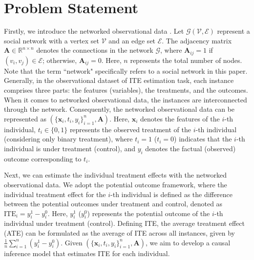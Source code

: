 \documentclass[twoside,leqno,twocolumn]{article}
\begin{document}
\section{Problem Statement}
Firstly, we introduce the networked observational data \cite{guo2020learning}. Let $\mathcal{G({V, E})}$ represent a social network with a vertex set $\mathcal{V}$ and an edge set $\mathcal{E}$. The adjacency matrix $\mathbf{A}\in \mathbb{R}^{n \times n}$ denotes the connections in the network $\mathcal{G}$, where $\mathbf{A}_{ij}=1$ if $(v_i, v_j)\in \mathcal{E}$; otherwise, $\mathbf{A}_{ij}=0$. Here, $n$ represents the total number of nodes. Note that the term ``network" specifically refers to a social network in this paper. 
Generally, in the observational dataset of ITE estimation task, each instance comprises three parts: the features (variables), the treatments, and the outcomes. 
When it comes to networked observational data, the instances are interconnected through the network. Consequently, the networked observational data can be represented as $(\{\mathbf{x}_i, t_i, y_i\}_{i=1}^n, \mathbf{A})$. Here, $\mathbf{x}_i$ denotes the features of the $i$-th individual, $t_i \in \{0,1\}$ represents the observed treatment of the $i$-th individual (considering only binary treatment), where $t_i=1$ ($t_i=0$) indicates that the $i$-th individual is under treatment (control), and $y_i$ denotes the factual (observed) outcome corresponding to $t_i$.

Next, we can estimate the individual treatment effects with the networked observational data. We adopt the potential outcome framework, where the individual treatment effect for the $i$-th individual is defined as the difference between the potential outcomes under treatment and control, denoted as $\text{ITE}_i=y_i^1-y_i^0$. Here, $y_i^1$ ($y_i^0$) represents the potential outcome of the $i$-th individual under treatment (control). Defining ITE, the average treatment effect (ATE) can be formulated as the average of ITE across all instances, given by $\frac{1}{n} \sum_{i=1}^{n}(y_i^1-y_i^0)$. Given $(\{\mathbf{x}_i, t_i, y_i\}_{i=1}^n, \mathbf{A})$, we aim to develop a causal inference model that estimates ITE for each individual.
\end{document}
